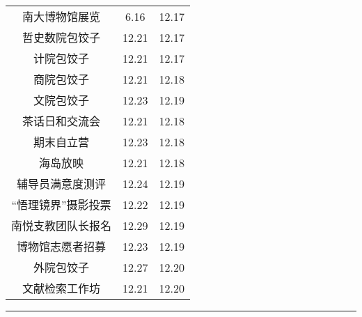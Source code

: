 \documentclass[letterpaper, 12pt]{article}
\begin{document}
\begin{multicols}{2}
{\begin{longtable}{|c|c|c|}
    南大博物馆展览 & 6.16 & 12.17\\
    哲史数院包饺子 & 12.21 & 12.17\\
    计院包饺子 & 12.21 & 12.17\\
    商院包饺子 & 12.21 & 12.18\\
    文院包饺子 & 12.23 & 12.19\\
    茶话日和交流会 & 12.21 & 12.18\\
    期末自立营 & 12.23 & 12.18\\
    海岛放映 & 12.21 & 12.18\\
    辅导员满意度测评 & 12.24 & 12.19\\
    “悟理镜界”摄影投票 & 12.22 & 12.19\\
    南悦支教团队长报名 & 12.29 & 12.19\\
    博物馆志愿者招募 & 12.23 & 12.19\\
    外院包饺子 & 12.27 & 12.20\\
    文献检索工作坊 & 12.21 & 12.20\\
    \hline
\end{longtable}
\unskip
\unpenalty
\unpenalty}\unvbox\colbbox
\end{multicols}
\hrule
\pagebreak
\end{document}
